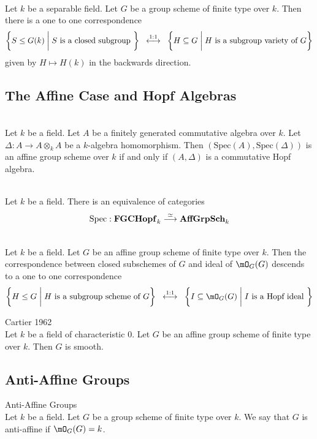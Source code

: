\documentclass[a4paper]{article}
\begin{document}
\begin{crl}{}{}\\
Let $k$ be a separable field. Let $G$ be a group scheme of finite type over $k$. Then there is a one to one correspondence $$\left\{S\leq G(k)\;\bigg{|}\;S\text{ is a closed subgroup }\right\}\;\;\overset{1:1}{\longleftrightarrow}\;\;\left\{H\subseteq G\;\bigg{|}\;H\text{ is a subgroup variety of }G\right\}$$ given by $H\mapsto H(k)$ in the backwards direction. 
\end{crl}

\subsection{The Affine Case and Hopf Algebras}
\begin{prp}{}{}\\
Let $k$ be a field. Let $A$ be a finitely generated commutative algebra over $k$. Let $\Delta:A\to A\otimes_kA$ be a $k$-algebra homomorphism. Then $(\text{Spec}(A),\text{Spec}(\Delta))$ is an affine group scheme over $k$ if and only if $(A,\Delta)$ is a commutative Hopf algebra. 
\end{prp}

\begin{prp}{}{}\\
Let $k$ be a field. There is an equivalence of categories $$\text{Spec}:\bold{FGCHopf}_k\overset{\simeq}{\longrightarrow}\bold{AffGrpSch}_k$$
\end{prp}

\begin{prp}{}{}\\
Let $k$ be a field. Let $G$ be an affine group scheme of finite type over $k$. Then the correspondence between closed subschemes of $G$ and ideal of $\mO_G(G)$ descends to a one to one correspondence $$\left\{H\leq G\;\bigg{|}\;H\text{ is a subgroup scheme of }G\right\}\;\;\overset{1:1}{\longleftrightarrow}\;\;\left\{I\subseteq\mO_G(G)\;\bigg{|}\;I\text{ is a Hopf ideal }\right\}$$
\end{prp}

\begin{thm}{Cartier 1962}{}\\
Let $k$ be a field of characteristic $0$. Let $G$ be an affine group scheme of finite type over $k$. Then $G$ is smooth. 
\end{thm}

\subsection{Anti-Affine Groups}
\begin{defn}{Anti-Affine Groups}{}\\
Let $k$ be a field. Let $G$ be a group scheme of finite type over $k$. We say that $G$ is anti-affine if $\mO_G(G)=k$. 
\end{defn}
\end{document}
